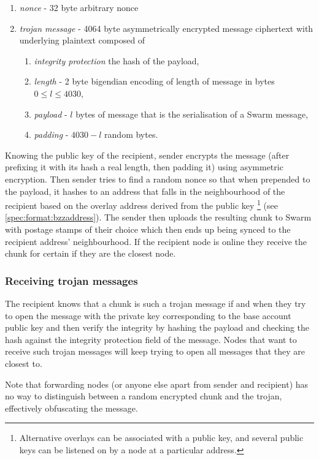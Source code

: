 \begin{enumerate}
    \item \emph{nonce} - 32 byte arbitrary nonce 
    \item \emph{trojan  message} - 4064 byte asymmetrically encrypted message ciphertext with underlying plaintext composed of
    \begin{enumerate}
        \item \emph{integrity protection} the hash of the payload, 
        \item \emph{length} - 2 byte bigendian encoding of length of message in bytes $0\leq l\leq 4030$,
        \item \emph{payload} - $l$ bytes of message that is the serialisation of a Swarm message,
        \item \emph{padding} - $4030-l$ random bytes.
    \end{enumerate}
\end{enumerate}

Knowing the public key of the recipient, sender encrypts the message (after prefixing it with its hash a real length, then padding it) using asymmetric encryption. Then sender tries to find a random nonce so that when prepended to the payload, it hashes to an address that falls in the neighbourhood of the recipient based on the overlay address derived from the public key%
%
\footnote{Alternative overlays can be associated with a public key, and several public keys can be listened on by a node at a particular address.}
%
(see \ref{spec:format:bzzaddress}). The sender then uploads the resulting chunk to Swarm with postage stamps of their choice which then ends up being synced to the recipient address' neighbourhood. If the recipient node is online they receive the chunk for certain if they are the closest node. 

\subsubsection{Receiving trojan messages}

The recipient knows that a chunk is such a trojan message if and when they try to open the message with the private key corresponding to the base account public key and then verify the integrity by hashing the payload and checking the hash against the integrity protection field of the message. Nodes that want to receive such trojan messages will keep trying to open all messages that they are closest to.

Note that forwarding nodes (or anyone else apart from sender and recipient) has no way to distinguish between a random encrypted chunk and the trojan, effectively obfuscating the message.  

